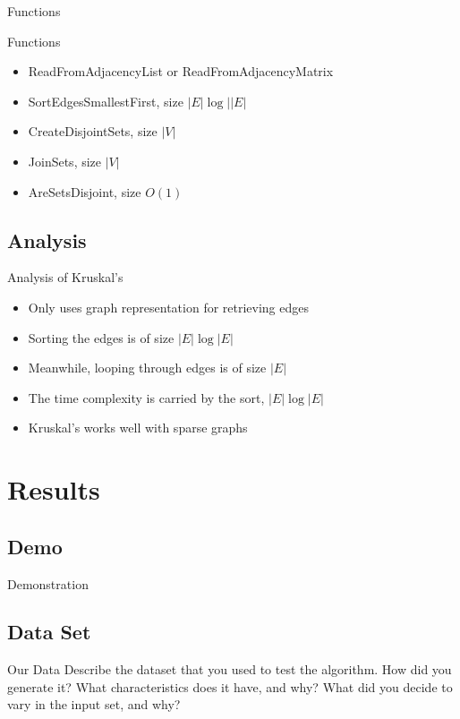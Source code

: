\documentclass{beamer}
\begin{document}
\begin{frame}{Functions}
\begin{frame}
\begin{frame}{Functions}
    \begin{itemize}
    \item ReadFromAdjacencyList or ReadFromAdjacencyMatrix
    \item SortEdgesSmallestFirst, size $|E|\log||E|$
    \item CreateDisjointSets, size $|V|$
    \item JoinSets, size $|V|$
    \item AreSetsDisjoint, size $O(1)$
    \end{itemize}
\end{frame}

\subsection{Analysis}
\begin{frame}{Analysis of Kruskal's}
    \begin{itemize}
    \item Only uses graph representation for retrieving edges
    \item Sorting the edges is of size $|E|\log|E|$
    \item Meanwhile, looping through edges is of size $|E|$
    \item The time complexity is carried by the sort, $|E|\log|E|$
    \item Kruskal's works well with sparse graphs
    \end{itemize}   
\end{frame}


\section{Results}\frame{\sectionpage}
\subsection{Demo}
\begin{frame}{Demonstration}
\end{frame}

\subsection{Data Set}
\begin{frame}{Our Data}
    Describe the dataset that you used to test the algorithm. How did you
    generate it? What characteristics does it have, and why? What did you
    decide to vary in the input set, and why?
\end{frame}


\end{frame}
\end{frame}
\end{document}
